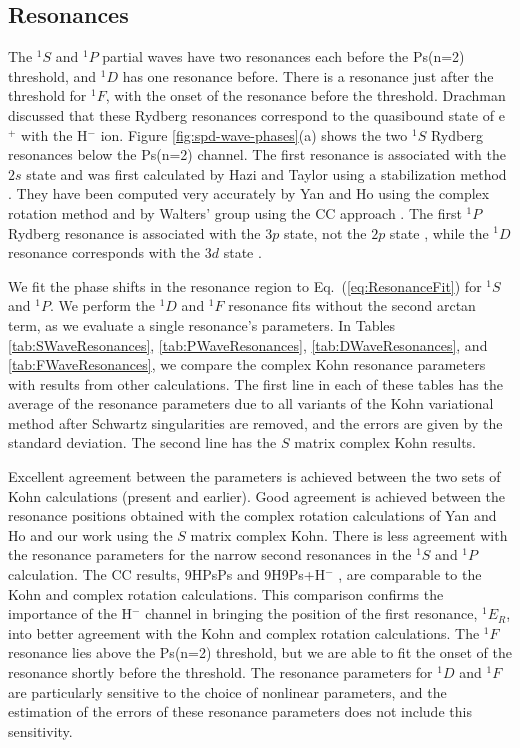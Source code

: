 \documentclass[preprint,showpacs,showkeys,preprintnumbers,amsmath,amssymb,longbibliography,pra,aps]{revtex4-1}
\begin{document}
\subsection{Resonances}
\label{sec:Resonances}

The $^1S$ and $^1P$ partial waves have two resonances each before the Ps(n=2) 
threshold, and $^1D$ has one resonance before. There is a resonance just 
after the threshold for $^1F$, with the onset of the resonance before the 
threshold. Drachman \cite{Drachman1979} discussed that these Rydberg 
resonances correspond to the quasibound state of e$^+$ with the H$^-$ ion.
Figure \ref{fig:spd-wave-phases}(a) shows the 
two $^1S$ Rydberg resonances below the Ps(n=2) channel. The first resonance 
is associated with the $2s$ state \cite{DiRienzi2002b} and was first 
calculated by Hazi and Taylor using a stabilization method \cite{Hazi1970}. 
They have been computed very accurately by Yan and Ho using the complex 
rotation method \cite{Yan1999} and by Walters' group using the CC 
approach \cite{Walters2004}. The first $^1P$ Rydberg resonance is associated
with the $3p$ state, not the $2p$ state \cite{DiRienzi2002b}, while the $^1D$ 
resonance corresponds with the $3d$ state \cite{DiRienzi2002a}.

We fit the phase shifts in the resonance region to Eq.~(\ref{eq:ResonanceFit})
for $^1S$ and $^1P$. We perform the $^1D$ and $^1F$ resonance fits without 
the second arctan term, as we evaluate a single resonance's parameters. In 
Tables \ref{tab:SWaveResonances}, \ref{tab:PWaveResonances},
\ref{tab:DWaveResonances}, and \ref{tab:FWaveResonances}, we compare the
complex Kohn resonance parameters with results from other calculations. The
first line in each of these tables has the average of the resonance parameters
due to all variants of the Kohn variational method after Schwartz singularities
are removed, and the errors are given by the standard deviation. The second 
line has the $S$ matrix complex Kohn results.

Excellent agreement between the parameters is achieved between the two sets 
of Kohn calculations (present and earlier). Good agreement is achieved 
between the resonance positions obtained with the complex rotation 
calculations of Yan and Ho \cite{Yan1999,Yan1998a,Ho1998,Ho2000} and our 
work using the $S$ matrix complex Kohn. There is less agreement with the
resonance parameters for the narrow second resonances in the $^1S$ and $^1P$
calculation. The CC results, 9HPsPs \cite{Blackwood2002} and
9H9Ps+H$^-$ \cite{Walters2004},
are comparable to the Kohn and complex rotation calculations. This 
comparison confirms the importance of the H$^-$ channel in bringing the 
position of the first resonance, $^1E_R$, into better agreement with the Kohn 
and complex rotation calculations. The $^1F$ resonance lies above the
Ps(n=2) threshold, but we are able to fit the onset of the resonance shortly
before the threshold.
The resonance parameters for $^1D$ and $^1F$ are particularly
sensitive to the choice of nonlinear parameters, and the estimation of the
errors of these resonance parameters does not include this sensitivity.
\end{document}
